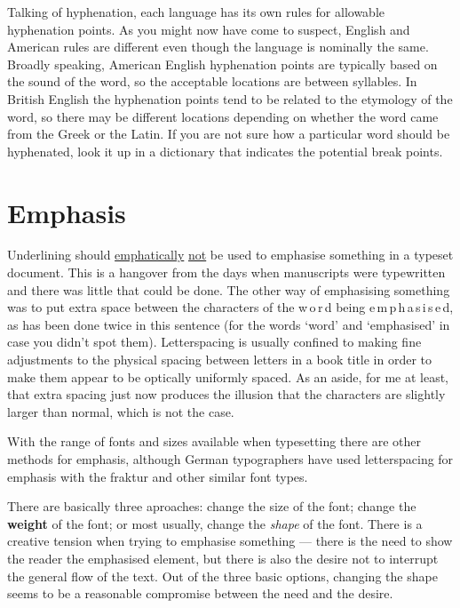 \documentclass[10pt,a4paper,extrafontsizes]{memoir}
\begin{document}

\begin{paracol}{2}
\switchEng
    Talking of hyphenation,
 each language has its own rules for allowable
hyphenation points. As you might now have come to suspect, English and 
American rules are different even though the language is nominally the same.
Broadly speaking, American English hyphenation points are typically based on
the sound of the word, so the acceptable locations are between syllables.
In British English the hyphenation points tend to be related to the
etymology of the word, so there may be different locations depending on 
whether the word came from the Greek or the Latin. If you are not sure
how a particular word should be hyphenated, look it up in a dictionary
that indicates the potential break points.
\end{paracol}

\section{Emphasis}

\begin{paracol}{2}
\switchEng
    Underlining should \underline{emphatically} \underline{not} be
used to emphasise something in a typeset document. This is a hangover
from the days when manuscripts were typewritten and there was little
that could be done. The other way of emphasising something was to
put extra space between the characters of the w\,o\,r\,d being
e\,m\,p\,h\,a\,s\,i\,s\,e\,d, as has been done twice in this sentence
(for the words `word' and `emphasised' in case you didn't spot them).
Letterspacing is usually confined to making fine adjustments to the 
physical spacing between letters in a book
title in order to make them appear to be optically uniformly spaced. 
As an aside, for me at least, that extra spacing just now produces the 
illusion that the
characters are slightly larger than normal, which is not the case.

    With the range of fonts and sizes available when typesetting there
are other methods for emphasis, although German typographers have used
letterspacing for emphasis with the fraktur and other similar font types.

    There are basically three aproaches: 
change the {\Large size} of the font;
change the \textbf{weight} of the font; or most usually, change the
\emph{shape} of the font. There is a creative tension when trying
to emphasise something --- there is the need to show the reader the 
emphasised
element, but there is also the desire not to interrupt the general flow
of the text. Out of the three basic options, changing the shape seems
to be a reasonable compromise between the need and the desire.
\end{paracol}
\end{document}
